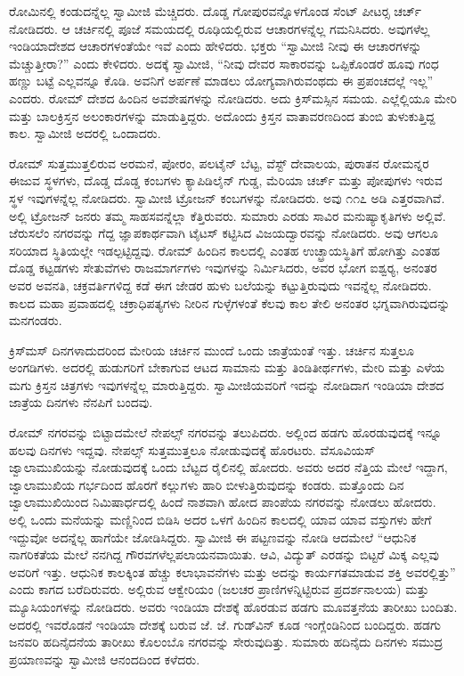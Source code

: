  ರೋಮಿನಲ್ಲಿ ಕಂಡುದನ್ನೆಲ್ಲ ಸ್ವಾಮೀಜಿ ಮೆಚ್ಚಿದರು. ದೊಡ್ಡ ಗೋಪುರವನ್ನೊಳಗೊಂಡ ಸೆಂಟ್ ಪೀಟರ‍್ಸ ಚರ್ಚ್ ನೋಡಿದರು. ಆ ಚರ್ಚಿನಲ್ಲಿ ಪೂಜೆ ಸಮಯದಲ್ಲಿ ರೂಢಿಯಲ್ಲಿರುವ ಆಚಾರಗಳನ್ನೆಲ್ಲ ಗಮನಿಸಿದರು. ಅವುಗಳೆಲ್ಲ ಇಂಡಿಯಾದೇಶದ ಆಚಾರಗಳಂತೆಯೇ ಇವೆ ಎಂದು ಹೇಳಿದರು. ಭಕ್ತರು “ಸ್ವಾಮೀಜಿ ನೀವು ಈ ಆಚಾರಗಳನ್ನು ಮೆಚ್ಚುತ್ತೀರಾ?” ಎಂದು ಕೇಳಿದರು. ಅದಕ್ಕೆ ಸ್ವಾಮೀಜಿ, “ನೀವು ದೇವರ ಸಾಕಾರವನ್ನು ಒಪ್ಪಿಕೊಂಡರೆ ಹೂವು ಗಂಧ ಹಣ್ಣು ಬಟ್ಟೆ ಎಲ್ಲವನ್ನೂ ಕೊಡಿ. ಅವನಿಗೆ ಅರ್ಪಣೆ ಮಾಡಲು ಯೋಗ್ಯವಾಗಿರುವಂಥದು ಈ ಪ್ರಪಂಚದಲ್ಲೆ ಇಲ್ಲ” ಎಂದರು. ರೋಮ್ ದೇಶದ ಹಿಂದಿನ ಅವಶೇಷಗಳನ್ನು ನೋಡಿದರು. ಅದು ಕ್ರಿಸ್‍ಮಸ್ಸಿನ ಸಮಯ. ಎಲ್ಲೆಲ್ಲಿಯೂ ಮೇರಿ ಮತ್ತು ಬಾಲಕ್ರಿಸ್ತನ ಅಲಂಕಾರಗಳನ್ನು ಮಾಡುತ್ತಿದ್ದರು. ಅದೊಂದು ಕ್ರಿಸ್ತನ ವಾತಾವರಣದಿಂದ ತುಂಬಿ ತುಳುಕುತ್ತಿದ್ದ ಕಾಲ. ಸ್ವಾಮೀಜಿ ಅದರಲ್ಲಿ ಒಂದಾದರು. 

 ರೋಮ್ ಸುತ್ತಮುತ್ತಲಿರುವ ಅರಮನೆ, ಪೋರಂ, ಪಲಟೈನ್ ಬೆಟ್ಟ, ವೆಸ್ಟ್ ದೇವಾಲಯ, ಪುರಾತನ ರೋಮನ್ನರ ಈಜುವ ಸ್ಥಳಗಳು, ದೊಡ್ಡ ದೊಡ್ಡ ಕಂಬಗಳು ಕ್ಯಾಪಿಡಿಲೈನ್ ಗುಡ್ಡ, ಮೆರಿಯಾ ಚರ್ಚ್ ಮತ್ತು ಪೋಪುಗಳು ಇರುವ ಸ್ಥಳ ಇವುಗಳನ್ನೆಲ್ಲ ನೋಡಿದರು. ಸ್ವಾಮೀಜಿ ಟ್ರೋಜನ್ ಕಂಬಗಳನ್ನು ನೋಡಿದರು. ಅವು ೧೧೭ ಅಡಿ ಎತ್ತರವಾಗಿವೆ. ಅಲ್ಲಿ ಟ್ರೋಜನ್ ಜನರು ತಮ್ಮ ಸಾಹಸವನ್ನೆಲ್ಲಾ ಕೆತ್ತಿರುವರು. ಸುಮಾರು ಎರಡು ಸಾವಿರ ಮನುಷ್ಯಾಕೃತಿಗಳು ಅಲ್ಲಿವೆ. ಜೆರುಸಲೆಂ ನಗರವನ್ನು ಗೆದ್ದ ಜ್ಞಾಪಕಾರ್ಥವಾಗಿ ಟೈಟಸ್ ಕಟ್ಟಿಸಿದ ವಿಜಯದ್ವಾರವನ್ನು ನೋಡಿದರು. ಅವು ಆಗಲೂ ಸರಿಯಾದ ಸ್ಥಿತಿಯಲ್ಲೇ ಇಡಲ್ಪಟ್ಟಿದ್ದವು. ರೋಮ್ ಹಿಂದಿನ ಕಾಲದಲ್ಲಿ ಎಂತಹ ಉಚ್ಛ್ರಾಯಸ್ಥಿತಿಗೆ ಹೋಗಿತ್ತು ಎಂತಹ ದೊಡ್ಡ ಕಟ್ಟಡಗಳು ಸೇತುವೆಗಳು ರಾಜಮಾರ್ಗಗಳು ಇವುಗಳನ್ನು ನಿರ್ಮಿಸಿದರು, ಅವರ ಭೋಗ ಐಶ್ವರ‍್ಯ, ಅನಂತರ ಅವರ ಅವನತಿ, ಚಕ್ರವರ್ತಿಗಳಿದ್ದ ಕಡೆ ಈಗ ಜೇಡರ ಹುಳು ಬಲೆಯನ್ನು ಕಟ್ಟುತ್ತಿರುವುದು ಇವನ್ನೆಲ್ಲ ನೋಡಿದರು. ಕಾಲದ ಮಹಾ ಪ್ರವಾಹದಲ್ಲಿ ಚಕ್ರಾಧಿಪತ್ಯಗಳು ನೀರಿನ ಗುಳ್ಳೆಗಳಂತೆ ಕೆಲವು ಕಾಲ ತೇಲಿ ಅನಂತರ ಭಗ್ನವಾಗಿರುವುದನ್ನು ಮನಗಂಡರು. 

 ಕ್ರಿಸ್‍ಮಸ್ ದಿನಗಳಾದುದರಿಂದ ಮೇರಿಯ ಚರ್ಚಿನ ಮುಂದೆ ಒಂದು ಜಾತ್ರೆಯಂತೆ ಇತ್ತು. ಚರ್ಚಿನ ಸುತ್ತಲೂ ಅಂಗಡಿಗಳು. ಅದರಲ್ಲಿ ಹುಡುಗರಿಗೆ ಬೇಕಾಗುವ ಆಟದ ಸಾಮಾನು ಮತ್ತು ತಿಂಡಿತೀರ್ಥಗಳು, ಮೇರಿ ಮತ್ತು ಎಳೆಯ ಮಗು ಕ್ರಿಸ್ತನ ಚಿತ್ರಗಳು ಇವುಗಳನ್ನೆಲ್ಲ ಮಾರುತ್ತಿದ್ದರು. ಸ್ವಾಮೀಜಿಯವರಿಗೆ ಇದನ್ನು ನೋಡಿದಾಗ ಇಂಡಿಯಾ ದೇಶದ ಜಾತ್ರೆಯ ದಿನಗಳು ನೆನಪಿಗೆ ಬಂದವು. 

 ರೋಮ್ ನಗರವನ್ನು ಬಿಟ್ಟಾದಮೇಲೆ ನೇಪಲ್ಸ್ ನಗರವನ್ನು ತಲುಪಿದರು. ಅಲ್ಲಿಂದ ಹಡಗು ಹೊರಡುವುದಕ್ಕೆ ಇನ್ನೂ ಹಲವು ದಿನಗಳು ಇದ್ದವು. ನೇಪಲ್ಸ್ ಸುತ್ತಮುತ್ತಲೂ ನೋಡುವುದಕ್ಕೆ ಹೊರಟರು. ವೆಸೂವಿಯಸ್ ಜ್ವಾಲಾಮುಖಿಯನ್ನು ನೋಡುವುದಕ್ಕೆ ಒಂದು ಬೆಟ್ಟದ ರೈಲಿನಲ್ಲಿ ಹೋದರು. ಅವರು ಅದರ ನೆತ್ತಿಯ ಮೇಲೆ ಇದ್ದಾಗ, ಜ್ವಾಲಾಮುಖಿಯ ಗರ್ಭದಿಂದ ಹೊರಗೆ ಕಲ್ಲುಗಳು ಹಾರಿ ಬೀಳುತ್ತಿರುವುದನ್ನು ಕಂಡರು. ಮತ್ತೊಂದು ದಿನ ಜ್ವಾಲಾಮುಖಿಯಿಂದ ನಿಮಿಷಾರ್ಧದಲ್ಲಿ ಹಿಂದೆ ನಾಶವಾಗಿ ಹೋದ ಪಾಂಪೆಯ ನಗರವನ್ನು ನೋಡಲು ಹೋದರು. ಅಲ್ಲಿ ಒಂದು ಮನೆಯನ್ನು ಮಣ್ಣಿನಿಂದ ಬಿಡಿಸಿ ಅದರ ಒಳಗೆ ಹಿಂದಿನ ಕಾಲದಲ್ಲಿ ಯಾವ ಯಾವ ವಸ್ತುಗಳು ಹೇಗೆ ಇದ್ದುವೋ ಅದನ್ನೆಲ್ಲ ಹಾಗೆಯೇ ಜೋಡಿಸಿದ್ದರು. ಸ್ವಾಮೀಜಿ ಈ ಪಟ್ಟಣವನ್ನು ನೋಡಿ ಆದಮೇಲೆ “ಆಧುನಿಕ ನಾಗರಿಕತೆಯ ಮೇಲೆ ನನಗಿದ್ದ ಗೌರವಗಳೆಲ್ಲ\break ಪಲಾಯನವಾಯಿತು. ಆವಿ, ವಿದ್ಯುತ್ ಎರಡನ್ನು ಬಿಟ್ಟರೆ ಮಿಕ್ಕ ಎಲ್ಲವು ಅವರಿಗೆ ಇತ್ತು. ಆಧುನಿಕ ಕಾಲಕ್ಕಿಂತ ಹೆಚ್ಚು ಕಲಾಭಾವನೆಗಳು ಮತ್ತು ಅದನ್ನು ಕಾರ್ಯಗತಮಾಡುವ ಶಕ್ತಿ ಅವರಲ್ಲಿತ್ತು” ಎಂದು ಕಾಗದ ಬರೆದಿರುವರು. ಅಲ್ಲಿರುವ ಆಕ್ವೇರಿಯಂ (ಜಲಚರ ಪ್ರಾಣಿಗಳನ್ನಿಟ್ಟಿರುವ ಪ್ರದರ್ಶನಾಲಯ) ಮತ್ತು ಮ್ಯೂಸಿಯಂಗಳನ್ನು ನೋಡಿದರು. ಅವರು ಇಂಡಿಯಾ ದೇಶಕ್ಕೆ ಹೊರಡುವ ಹಡಗು ಮೂವತ್ತನೆಯ ತಾರೀಖು ಬಂದಿತು. ಅದರಲ್ಲಿ ಇವರೊಡನೆ ಇಂಡಿಯಾ ದೇಶಕ್ಕೆ ಬರುವ ಜೆ. ಜೆ. ಗುಡ್‍ವಿನ್ ಕೂಡ ಇಂಗ್ಲೆಂಡಿನಿಂದ ಬಂದಿದ್ದರು. ಹಡಗು ಜನವರಿ ಹದಿನೈದನೆಯ ತಾರೀಖು ಕೊಲಂಬೊ ನಗರವನ್ನು ಸೇರುವುದಿತ್ತು. ಸುಮಾರು ಹದಿನೈದು ದಿನಗಳು ಸಮುದ್ರ ಪ್ರಯಾಣವನ್ನು ಸ್ವಾಮೀಜಿ ಆನಂದದಿಂದ ಕಳೆದರು. 

